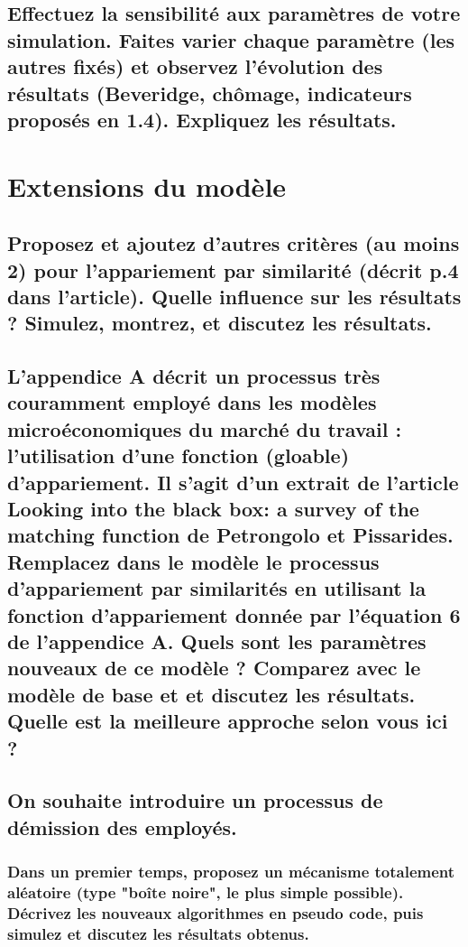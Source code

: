 \documentclass[10pt,a4paper]{article}
\begin{document}
    \subsection{Effectuez la sensibilité aux paramètres de votre simulation. Faites varier chaque paramètre (les autres fixés) et observez l'évolution des résultats (Beveridge, chômage, indicateurs proposés en 1.4). Expliquez les résultats.}
    
    \section{Extensions du modèle}
    
    \subsection{Proposez et ajoutez d'autres critères (au moins 2) pour l'appariement par similarité (décrit p.4 dans l'article). Quelle influence sur les résultats ? Simulez, montrez, et discutez les résultats.}
    
    \subsection{L'appendice A décrit un processus très couramment employé dans les modèles microéconomiques du marché du travail : l'utilisation d'une fonction (gloable) d'appariement. Il s'agit d'un extrait de l'article Looking into the black box: a survey of the matching function de Petrongolo et Pissarides.
    Remplacez dans le modèle le processus d'appariement par similarités en utilisant la fonction d'appariement donnée par l'équation 6 de l'appendice A. Quels sont les paramètres nouveaux de ce modèle ? Comparez avec le modèle de base et et discutez les résultats. Quelle est la meilleure approche selon vous ici ?}
    
    \subsection{On souhaite introduire un processus de démission des employés.}
    
    \subsubsection{Dans un premier temps, proposez un mécanisme totalement aléatoire (type "boîte noire", le plus simple possible). Décrivez les nouveaux algorithmes en pseudo code, puis simulez et discutez les résultats obtenus.}
    
\end{document}
